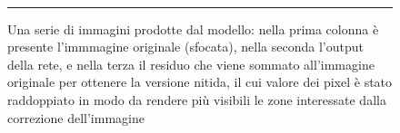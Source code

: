 \documentclass[a4paper,10pt,twocolumn]{article}
\begin{document}
\begin{figure}[p]
\begin{mdframed}[
      linewidth=1pt,
      innertopmargin=6pt,
      innerbottommargin=6pt,
      innerleftmargin=6pt,
      innerrightmargin=6pt
      linecolor=black,
      nobreak
    ]
{    }\hspace{0.1cm}\hfill
    \hspace{0.1cm}\hfill
    \hspace{0.1cm}\hfill
    \\ \vspace{0.3cm}

    \vspace{3pt}
    \hrule
    \vspace{3pt}
    \caption{
      Una serie di immagini prodotte dal modello: nella prima colonna è presente l'immmagine originale (sfocata), nella seconda l'output della rete,
      e nella terza il residuo che viene sommato all'immagine originale per ottenere la versione nitida,
      il cui valore dei pixel è stato raddoppiato in modo da rendere più visibili le zone interessate dalla correzione dell'immagine
    }
  \end{mdframed}
  \label{foto_esempio}
\end{figure}

\FloatBarrier

\printglossary[title=Glossario, toctitle=Glossario]

\printbibliography
\end{document}
